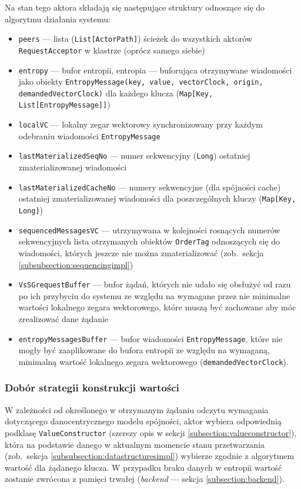 Na stan tego aktora składają się następujące struktury odnoszące się do algorytmu działania systemu:
\begin{itemize}
    \item \texttt{peers} --- lista (\texttt{List[ActorPath]}) ścieżek do wszystkich aktorów \texttt{RequestAcceptor} w klastrze (oprócz samego siebie)
    \item \texttt{entropy} --- bufor entropii, entropia --- buforująca otrzymywane wiadomości jako obiekty \texttt{EntropyMessage(key, value, vectorClock, origin, demandedVectorClock)} dla każdego klucza (\texttt{Map[Key, List[EntropyMessage]]})
    \item \texttt{localVC} --- lokalny zegar wektorowy synchronizowany przy każdym odebraniu wiadomości \texttt{EntropyMessage}
    \item \texttt{lastMaterializedSeqNo} --- numer sekwencyjny (\texttt{Long}) ostatniej zmaterializowanej wiadomości
    \item \texttt{lastMaterializedCacheNo} --- numery sekwencyjne (dla spójności cache) ostatniej zmaterializowanej wiadomości dla poszczególnych kluczy (\texttt{Map[Key, Long]})
    \item \texttt{sequencedMessagesVC} --- utrzymywana w kolejności rosnących numerów sekwencyjnych
        lista otrzymanych obiektów \texttt{OrderTag} odnoszących się do wiadomości, których jeszcze
        nie można zmaterializować (zob.\ sekcja \ref{subsubsection:sequencingimpl})
    \item \texttt{VsSGrequestBuffer} --- bufor żądań, których nie udało się obsłużyć od razu po ich przybyciu do systemu ze względu na wymagane przez nie minimalne wartości lokalnego zegara wektorowego, które muszą być zachowane aby móc zrealizować dane żądanie
    \item \texttt{entropyMessagesBuffer} --- bufor wiadomości \texttt{EntropyMessage}, które nie mogły być zaaplikowane do bufora entropii ze względu na wymaganą, minimalną wartość lokalnego zegara wektorowego (\texttt{demandedVectorClock}).
\end{itemize}

\subsubsection{Dobór strategii konstrukcji wartości}

W zależności od określonego w otrzymanym żądaniu odczytu wymagania dotyczącego danocentrycznego
modelu spójności, aktor wybiera odpowiednią podklasę \texttt{ValueConstructor} (szerszy opis w
sekcji \ref{subsection:valueconstructor}), która na podstawie danego w aktualnym momencie stanu
przetwarzania (zob.\ sekcja \ref{subsubsection:datastructuresimpl}) wybierze zgodnie z algorytmem wartość dla żądanego klucza. W przypadku braku danych w entropii wartość zostanie zwrócona z pamięci trwałej (\textit{backend} --- sekcja \ref{subsection:backend}).

